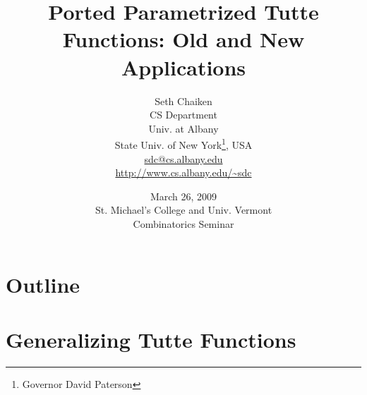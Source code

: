 \documentclass{beamer}
\title{Ported Parametrized Tutte Functions: Old and New Applications}
\author{Seth Chaiken\\
CS Department\\
Univ. at Albany\\
State Univ. of New York\footnote{Governor David Paterson}, USA\\
\url{sdc@cs.albany.edu}\\
\url{http://www.cs.albany.edu/~sdc}
}
\date{March 26, 2009\\
St. Michael's College and Univ. Vermont\\
Combinatorics Seminar}
\begin{document}
\newcommand{\Remph}[1]{{\color{red}#1}}

\newcommand{\dunion}
{\mbox{\hbox{\hskip6pt$\cdot$\hskip-5.50pt$\cup$\hskip2pt}}}
%


\newcommand{\pn}{\;\raisebox{-0.2\height}{}}
\newcommand{\qn}{\;\raisebox{-0.2\height}{}}
\newcommand{\pz}{\;\;\raisebox{-0.2\height}{}}
\newcommand{\qz}{\;\;\raisebox{-0.2\height}{}}
\newcommand{\pzqz}{\;\raisebox{-0.2\height}{}}
\newcommand{\pzqn}{\;\raisebox{-0.2\height}{}}
\newcommand{\pnqz}{\;\raisebox{-0.2\height}{}}
\newcommand{\pnqn}{\;\raisebox{-0.2\height}{}}
\newcommand{\pqegg}{\;\raisebox{-0.2\height}{}}

\newcommand{\pnsub}{}
\newcommand{\qnsub}{}
\newcommand{\pzsub}{}
\newcommand{\qzsub}{}
\newcommand{\pzqzsub}{}
\newcommand{\pzqnsub}{}
\newcommand{\pnqzsub}{}
\newcommand{\pnqnsub}{}
\newcommand{\pqeggsub}{}




\begin{frame}
\titlepage
\end{frame}
\section*{Outline}
\begin{frame}
\tableofcontents
\end{frame}

\section{Generalizing Tutte Functions}
\end{document}
